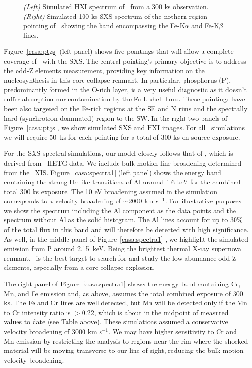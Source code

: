 \documentclass[11pt,a4paper]{article}
\begin{document}
{\begin{figure}
\begin{center}
  \caption{{\it (Left)} Simulated HXI spectrum of \casa\ from a 300 ks
    observation.  {\it (Right)} Simulated 100 ks SXS spectrum of the
    nothern region pointing of \casa\ showing the band encompassing the
    Fe-K$\alpha$ and Fe-K$\beta$ lines.}
      \label{casa:spectra2}
  \end{center}
  
\end{figure}

Figure~\ref{casa:ptgs} (left panel) shows five pointings that will allow
a complete coverage of \casa\ with the SXS. The central pointing's
primary objective is to address the odd-Z elements measurement,
providing key information on the nucleosynthesis in this core-collapse remnant.
In particular, phosphorus (P), predominantly formed in the O-rich layer,
is a very useful diagnostic as it doesn't suffer absorption nor contamination
by the Fe-L shell lines.
 These pointings have
been also targeted on the Fe-rich regions at the SE and N rims and the
spectrally hard (synchrotron-dominated) region to the SW.  In the
right two panels of Figure~\ref{casa:ptgs}, we show simulated SXS and HXI images.
For all \casa\ simulations we will require 50~ks for each pointing for a
total of 300 ks on-source exposure.

For the SXS spectral simulations, our model closely follows that of
\citet{casa_hetg}, which is derived from \chandra\ HETG data.  We
include bulk-motion line broadening determined from the \suzaku\ XIS.
Figure~\ref{casa:spectra1} (left panel) shows the energy band containing
the strong He-like transitions of Al around 1.6 keV for the combined
total 300 ks exposure. The 10 eV broadening assumed in the simulation
corresponds to a velocity broadening of $\sim$2000 km s$^{-1}$.  For
illustrative purposes we show the spectrum including the Al component
as the data points and the spectrum without Al as the solid histogram.
The Al lines account for up to 30\% of the total flux in this band and
will therefore be detected with high significance.  As well, in the middle
panel of Figure~\ref{casa:spectra1} , we highlight the simulated emission from P
around 2.15~keV.
Being the brightest thermal X-ray supernova remnant, \casa\ is the best target to search
for and study the low abundance odd-Z elements, especially from a core-collapse explosion.


The right panel of Figure~\ref{casa:spectra1} shows the energy band
containing Cr, Mn, and Fe emission and, as above, assumes the total
combined exposure of 300 ks.  The Fe and Cr lines are well detected,
but Mn will be detected only if the Mn to Cr intensity ratio is
$>$0.22, which is about in the midpoint of measured values to date
(see Table above).  These simulations assumed a conservative velocity
broadening of 3000 km s$^{-1}$. We may have higher sensitivity to Cr
and Mn emission by restricting the analysis to regions near the rim
where the shocked material will be moving transverse to our line of
sight, reducing the bulk-motion velocity broadening.

}
\end{document}
